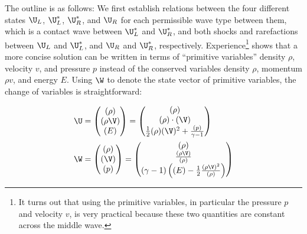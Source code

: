 The outline is as follows: We first establish relations between the four different states $\U_L$,
$\U_L^*$, $\U_R^*$, and $\U_R$ for each permissible wave type between them, which is a contact wave
between $\U_L^*$ and $\U_R^*$, and both shocks and rarefactions between $\U_L$ and $\U_L^*$, and
$\U_R$ and $\U_R^*$, respectively. Experience\footnote{It turns out that using the primitive variables, in particular the pressure $p$ and velocity $v$, is very practical because these two quantities are constant across the middle wave.} shows that a more concise solution can be written in terms of ``primitive variables'' density $\rho$, velocity $v$, and pressure $p$ instead of the
conserved variables density $\rho$, momentum $\rho v$, and energy $E$. Using $\W$ to denote the
state vector of primitive variables, the change of variables is straightforward:



\begin{align}
    \U &=
        \begin{pmatrix}
        (\rho) \\
        (\rho \V) \\
        (E)
        \end{pmatrix} =
        \begin{pmatrix}
        (\rho) \\
        (\rho) \cdot (\V) \\
        \frac{1}{2} (\rho) (\V)^2 + \frac{(p)}{\gamma - 1}
        \end{pmatrix}
    \\
    \W &=
        \begin{pmatrix}
        (\rho) \\
        (\V) \\
        (p)
        \end{pmatrix} =
        \begin{pmatrix}
        (\rho) \\
        \frac{(\rho \V )}{(\rho)} \\
        (\gamma - 1)  \left((E) - \frac{1}{2} \frac{(\rho \V)^2}{(\rho)} \right)
        \end{pmatrix}
\end{align}


